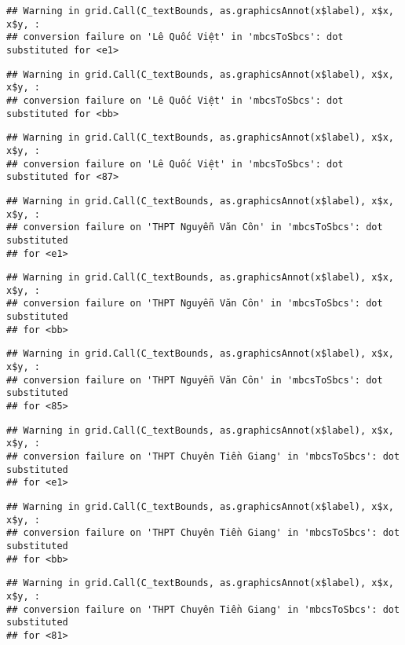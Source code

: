\documentclass[
]{article}
\begin{document}
\begin{verbatim}
## Warning in grid.Call(C_textBounds, as.graphicsAnnot(x$label), x$x, x$y, :
## conversion failure on 'Lê Quốc Việt' in 'mbcsToSbcs': dot substituted for <e1>
\end{verbatim}

\begin{verbatim}
## Warning in grid.Call(C_textBounds, as.graphicsAnnot(x$label), x$x, x$y, :
## conversion failure on 'Lê Quốc Việt' in 'mbcsToSbcs': dot substituted for <bb>
\end{verbatim}

\begin{verbatim}
## Warning in grid.Call(C_textBounds, as.graphicsAnnot(x$label), x$x, x$y, :
## conversion failure on 'Lê Quốc Việt' in 'mbcsToSbcs': dot substituted for <87>
\end{verbatim}

\begin{verbatim}
## Warning in grid.Call(C_textBounds, as.graphicsAnnot(x$label), x$x, x$y, :
## conversion failure on 'THPT Nguyễn Văn Côn' in 'mbcsToSbcs': dot substituted
## for <e1>
\end{verbatim}

\begin{verbatim}
## Warning in grid.Call(C_textBounds, as.graphicsAnnot(x$label), x$x, x$y, :
## conversion failure on 'THPT Nguyễn Văn Côn' in 'mbcsToSbcs': dot substituted
## for <bb>
\end{verbatim}

\begin{verbatim}
## Warning in grid.Call(C_textBounds, as.graphicsAnnot(x$label), x$x, x$y, :
## conversion failure on 'THPT Nguyễn Văn Côn' in 'mbcsToSbcs': dot substituted
## for <85>
\end{verbatim}

\begin{verbatim}
## Warning in grid.Call(C_textBounds, as.graphicsAnnot(x$label), x$x, x$y, :
## conversion failure on 'THPT Chuyên Tiền Giang' in 'mbcsToSbcs': dot substituted
## for <e1>
\end{verbatim}

\begin{verbatim}
## Warning in grid.Call(C_textBounds, as.graphicsAnnot(x$label), x$x, x$y, :
## conversion failure on 'THPT Chuyên Tiền Giang' in 'mbcsToSbcs': dot substituted
## for <bb>
\end{verbatim}

\begin{verbatim}
## Warning in grid.Call(C_textBounds, as.graphicsAnnot(x$label), x$x, x$y, :
## conversion failure on 'THPT Chuyên Tiền Giang' in 'mbcsToSbcs': dot substituted
## for <81>
\end{verbatim}
\end{document}
